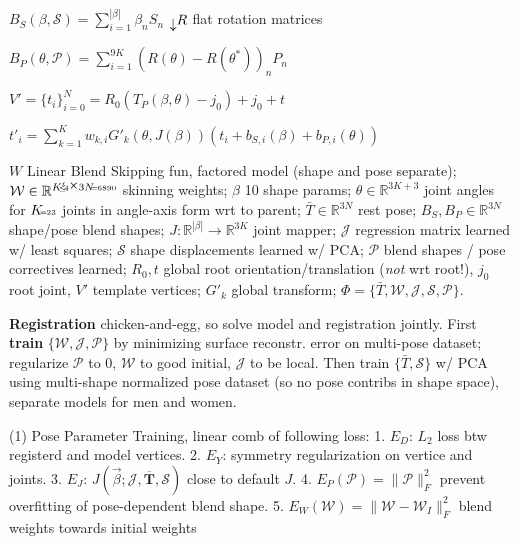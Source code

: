 \(B_S(\beta,\!\mathcal{S})=\sum_{i=1}^{|\beta|} \beta_n S_n\) \;\;\;\; $\text{\raisebox{-0.3em}{$\downarrow$}} R$ {\tiny flat rotation matrices}

\(B_P(\theta,\mathcal{P})=\sum_{i=1}^{9K}(R(\theta)-R(\theta^*))_n P_n\)

\(V'=\{t_i\}_{i=0}^N = R_0(T_P(\beta,\theta)-j_0) + j_0 + t\)

\(t'_i = \sum_{k=1}^{K}w_{k,i} G'_k(\theta, J(\beta)) (t_i \!\!+\!\! b_{S,i}(\beta) \!\!+\!\! b_{P,i}(\theta))\)

\vspace{3pt}
$W$ Linear Blend Skipping fun, factored model (shape and pose separate); $\mathcal{W} \in \mathbb{R}^{K' \text{\tiny{$\!\!\!\!\leq\!\!\! 4$}} \text{\raisebox{0.2em}{$\cross$}} 3N \text{\tiny{$\!\!=\!\! 6890$}}}$ skinning weights; $\beta$ 10 shape params; $\theta \in \mathbb{R}^{3K+3}$ joint angles for $K\text{\tiny{$\!\!=\!\!23$}}$ joints in angle-axis form wrt to parent; $\bar{T}\in\mathbb{R}^{3N}$ rest pose; $B_S, B_P \in\mathbb{R}^{3N}$ shape/pose blend shapes;  $J: \mathbb{R}^{|\beta|} \rightarrow \mathbb{R}^{3K}$ joint mapper; $\mathcal{J}$ regression matrix learned w/ least squares; $\mathcal{S}$ shape displacements learned w/ PCA; $\mathcal{P}$ blend shapes / pose correctives learned; $R_0, t$ global root orientation/translation (\textit{not} wrt root!), $j_0$ root joint, $V'$ template vertices; $G'_k$ \vspace{-2.5pt} global transform; $\Phi = \{\bar{T}, \mathcal{W}, \mathcal{J}, \mathcal{S}, \mathcal{P}\}$.

\vspace{3pt}
\textbf{Registration} chicken-and-egg, so solve model and registration jointly. First \textbf{train} $\{\mathcal{W}, \mathcal{J}, \mathcal{P}\}$ by minimizing surface reconstr. error on multi-pose dataset; regularize $\mathcal{P}$ to 0, $\mathcal{W}$ to good initial, $\mathcal{J}$ to be local. Then
\vspace{-2.3pt} train $\{\bar{T}, \mathcal{S}\}$ w/ PCA using multi-shape normalized pose dataset (so no pose contribs in shape space), separate models for men and women.

(1) Pose Parameter Training, linear comb of following loss:
1. \(E_D\): \(L_2\) loss btw registerd and model vertices.
2. \(E_Y\): symmetry regularization on vertice and joints.
3. \(E_J\): \(J(\vec{\beta} ; \mathcal{J}, \overline{\mathbf{T}}, \mathcal{S})\) close to default \(J\).
4. \(E_{P}(\mathcal{P})=\|\mathcal{P}\|_{F}^{2}\) prevent overfitting of pose-dependent blend shape.
5. \(E_{W}(\mathcal{W})=\|\mathcal{W}-\mathcal{W}_{I}\|_{F}^{2}\) blend weights towards initial weights

